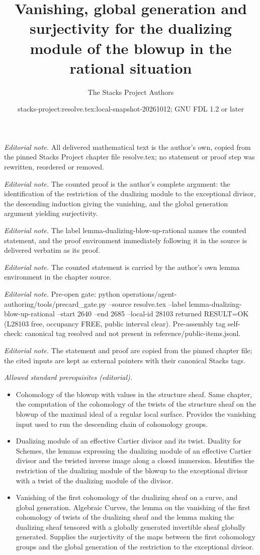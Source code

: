 \documentclass[10pt,a4paper]{amsart}
\title{Vanishing, global generation and surjectivity for the dualizing module of the blowup in the rational situation}
\author{The Stacks Project Authors}
\date{stacks-project:resolve.tex:local-snapshot-20261012; GNU FDL 1.2 or later}
\theoremstyle{plain}
\theoremstyle{definition}
\theoremstyle{remark}
\numberwithin{equation}{subsection}
\begin{document}
\maketitle
\noindent\textit{Editorial note.} All delivered mathematical text is the author's own, copied from the pinned Stacks Project chapter file resolve.tex; no statement or proof step was rewritten, reordered or removed.\par\medskip
\noindent\textit{Editorial note.} The counted proof is the author's complete argument: the identification of the restriction of the dualizing module to the exceptional divisor, the descending induction giving the vanishing, and the global generation argument yielding surjectivity.\par\medskip
\noindent\textit{Editorial note.} The label lemma-dualizing-blow-up-rational names the counted statement, and the proof environment immediately following it in the source is delivered verbatim as its proof.\par\medskip
\noindent\textit{Editorial note.} The counted statement is carried by the author's own lemma environment in the chapter source.\par\medskip
\noindent\textit{Editorial note.} Pre-open gate: python operations/agent-authoring/tools/precard\_gate.py --source resolve.tex --label lemma-dualizing-blow-up-rational --start 2640 --end 2685 --local-id 28103 returned RESULT=OK (L28103 free, occupancy FREE, public interval clear). Pre-assembly tag self-check: canonical tag resolved and not present in reference/public-items.jsonl.\par\medskip
\noindent\textit{Editorial note.} The statement and proof are copied from the pinned chapter file; the cited inputs are kept as external pointers with their canonical Stacks tags.\par\medskip
\noindent\textit{Allowed standard prerequisites (editorial).}\begin{itemize}
\item Cohomology of the blowup with values in the structure sheaf. Same chapter, the computation of the cohomology of the twists of the structure sheaf on the blowup of the maximal ideal of a regular local surface. Provides the vanishing input used to run the descending chain of cohomology groups.
\item Dualizing module of an effective Cartier divisor and its twist. Duality for Schemes, the lemmas expressing the dualizing module of an effective Cartier divisor and the twisted inverse image along a closed immersion. Identifies the restriction of the dualizing module of the blowup to the exceptional divisor with a twist of the dualizing module of the divisor.
\item Vanishing of the first cohomology of the dualizing sheaf on a curve, and global generation. Algebraic Curves, the lemma on the vanishing of the first cohomology of twists of the dualizing sheaf and the lemma making the dualizing sheaf tensored with a globally generated invertible sheaf globally generated. Supplies the surjectivity of the maps between the first cohomology groups and the global generation of the restriction to the exceptional divisor.
\end{itemize}\medskip
\end{document}
